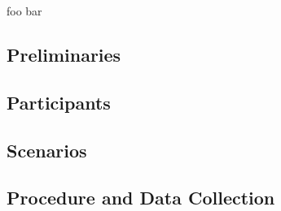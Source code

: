 foo bar

\subsection{\label{sec::Preliminaries}Preliminaries}

\subsection{\label{sec::Participants}Participants}

\subsection{\label{sec::Scenarios}Scenarios}

\subsection{\label{sec::Execution}Procedure and Data Collection}
